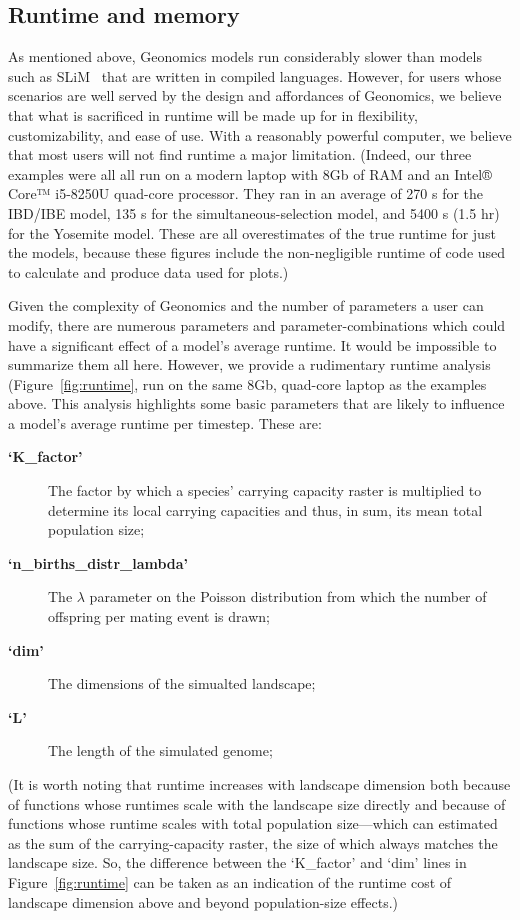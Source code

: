﻿\documentclass{article}
\begin{document}
\subsection{Runtime and memory}
As mentioned above, Geonomics models run considerably slower than models
such as SLiM~\cite{messer,haller} that are written in compiled languages.
However, for users whose scenarios are well served by the design
and affordances of Geonomics, we believe that what is sacrificed in
runtime will be made up for in flexibility, customizability, and ease of use.
With a reasonably powerful computer, we believe that most users
will not find runtime a major limitation.
(Indeed, our three examples were all all run on a modern laptop with 8Gb of RAM
and an Intel® Core™ i5-8250U quad-core processor. They ran in an average of
270 s for the IBD/IBE model, 135 s for the simultaneous-selection model,
and 5400 s (1.5 hr) for the Yosemite model. These are all overestimates of the true
runtime for just the models, because these figures include the non-negligible runtime
of code used to calculate and produce data used for plots.)

Given the complexity of Geonomics and the number of parameters
a user can modify, there are numerous parameters and parameter-combinations
which could have a significant effect of a model's average runtime.
It would be impossible to summarize them all here.
However, we provide a rudimentary runtime analysis (Figure~\ref{fig:runtime},
run on the same 8Gb, quad-core laptop as the examples above.
This analysis highlights some basic parameters
that are likely to influence a model's average runtime per timestep.
These are:
\begin{description}
  \item [\textbf{`K\_factor'}] The factor by which a species' carrying capacity
        raster is multiplied to determine its local carrying capacities
        and thus, in sum, its mean total population size;
  \item [\textbf{`n\_births\_distr\_lambda'}] The $\lambda$ parameter on the Poisson
        distribution from which the number of offspring per mating event
        is drawn;
  \item [\textbf{`dim'}] The dimensions of the simualted landscape;
  \item [\textbf{`L'}] The length of the simulated genome;
\end{description}
(It is worth noting that runtime increases with landscape dimension both because of functions
whose runtimes scale with the landscape size directly and because of functions
whose runtime scales with total population size---which can estimated as the sum of the 
carrying-capacity raster, the size of which always matches the landscape size.
So, the difference between the `K\_factor' and `dim' lines in Figure~\ref{fig:runtime}
can be taken as an indication of the runtime cost of landscape dimension
above and beyond population-size effects.)
\end{document}
